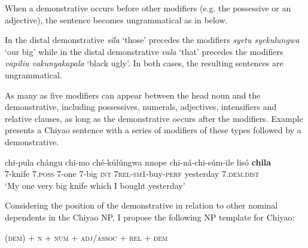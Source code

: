 \documentclass[output=paper,
            colorlinks, citecolor=brown
            ,draftmode
		  ]{langscibook}
\begin{document}
When a demonstrative occurs before other modifiers (e.g. the possessive or an adjective), the sentence becomes ungrammatical as in  below.


\ea%
    \label{ex:taji:24}
    \label{ex:taji:24a}


    \label{ex:taji:24b}
     \z
\z

In  the distal demonstrative \textit{sila} ‘those’ precedes the modifiers \textit{syetu    syekulungwa} ‘our big’ while in  the distal demonstrative \textit{vala} ‘that’ precedes the modifiers \textit{vapiliu vakunyakapala} ‘black ugly’. In both cases, the resulting sentences are ungrammatical. 

As many as five modifiers can appear between the head noun and the demonstrative, including possessives, numerals, adjectives, intensifiers and relative clauses, as long as the demonstrative occurs after the modifiers. Example  presents a Chiyao sentence with a series of modifiers of these types followed by a demonstrative.

\ea%
    \label{ex:taji:25}
    \gll chi-pula    chángu    chi-mo      ché-kúlúngwa    nnope    chi-ná-chi-súm-ile          lisó  \textbf{chila}\\  
  7-knife      7.\textsc{poss}    7-one          7-big                    \textsc{int}      \textsc{7rel-sm1}-buy-\textsc{perf}    yesterday  7.\textsc{dem.dist}\\  
  \glt ‘My one very big knife which I bought yesterday’
\z

Considering the position of the demonstrative in relation to other nominal dependents in the Chiyao NP, I propose the following NP template for Chiyao:

\ea%
    \label{ex:taji:26}
    (\textsc{dem}) + \textsc{n} + \textsc{num} + \textsc{adj/assoc} + \textsc{rel} + \textsc{dem} 
\z
\end{document}
